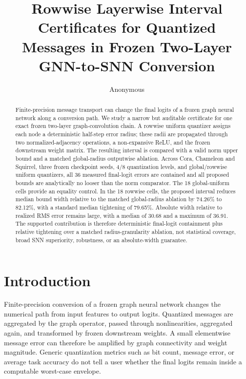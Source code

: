\documentclass{article}
\title{Rowwise Layerwise Interval Certificates for Quantized Messages in Frozen Two-Layer GNN-to-SNN Conversion}
\author{Anonymous}
\begin{document}
\begin{abstract}
Finite-precision message transport can change the final logits of a frozen graph neural network along a conversion path. We study a narrow but auditable certificate for one exact frozen two-layer graph-convolution chain. A rowwise uniform quantizer assigns each node a deterministic half-step error radius; these radii are propagated through two normalized-adjacency operations, a non-expansive ReLU, and the frozen downstream weight matrix. The resulting interval is compared with a valid norm upper bound and a matched global-radius outputwise ablation. Across Cora, Chameleon and Squirrel, three frozen checkpoint seeds, 4/8 quantization levels, and global/rowwise uniform quantizers, all 36 measured final-logit errors are contained and all proposed bounds are analytically no looser than the norm comparator. The 18 global-uniform cells provide an equality control. In the 18 rowwise cells, the proposed interval reduces median bound width relative to the matched global-radius ablation by 74.26\% to 82.12\%, with a standard median tightening of 79.65\%. Absolute width relative to realized RMS error remains large, with a median of 30.68 and a maximum of 36.91. The supported contribution is therefore deterministic final-logit containment plus relative tightening over a matched radius-granularity ablation, not statistical coverage, broad SNN superiority, robustness, or an absolute-width guarantee.
\end{abstract}

\maketitle

\section{Introduction}


Finite-precision conversion of a frozen graph neural network changes the numerical path from input features to output logits. Quantized messages are aggregated by the graph operator, passed through nonlinearities, aggregated again, and transformed by frozen downstream weights. A small elementwise message error can therefore be amplified by graph connectivity and weight magnitude. Generic quantization metrics such as bit count, message error, or average task accuracy do not tell a user whether the final logits remain inside a computable worst-case envelope.
\end{document}
